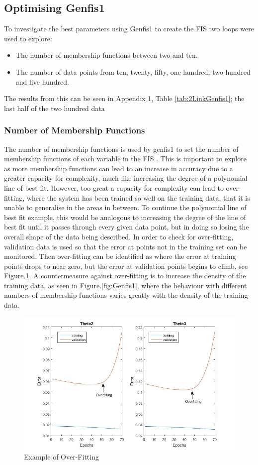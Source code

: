 \documentclass[11.5pt, twoside, a4paper]{article}
\begin{document}
\subsection{Optimising Genfis1}
To investigate the best parameters using Genfis1 to create the FIS two loops were used to explore:
\begin{itemize}
\item The number of membership functions between two and ten.
\item The number of data points from ten, twenty, fifty, one hundred, two hundred and five hundred.
\end{itemize}
The results from this can be seen in Appendix 1, Table \ref{tab:2LinkGenfis1}; the last half of the two hundred data

\subsubsection{Number of Membership Functions}
The number of membership functions is used by genfis1 to set the number of membership functions of each variable in the FIS \cite{genfis1}. This is important to explore as more membership functions can lead to an increase in accuracy due to a greater capacity for complexity, much like increasing the degree of a polynomial line of best fit. However, too great a capacity for complexity can lead to over-fitting, where the system has been trained so well on the training data, that it is unable to generalise in the areas in between. To continue the polynomial line of best fit example, this would be analogous to increasing the degree of the line of best fit until it passes through every given data point, but in doing so losing the overall shape of the data being described. In order to check for over-fitting, validation data is used so that the error at points not in the training set can be monitored. Then over-fitting can be identified as where the error at training points drops to near zero, but the error at validation points begins to climb, see Figure.\ref{fig:Overfitting}. A countermeasure against over-fitting is to increase the density of the training data, as seen in Figure.\ref{fig:Genfis1}, where the behaviour with different numbers of membership functions varies greatly with the density of the training data.
\begin{figure}
\includegraphics[width=\linewidth]{OverFitting.jpg}
\caption{Example of Over-Fitting\label{fig:Overfitting}}
\end{figure}
\end{document}
